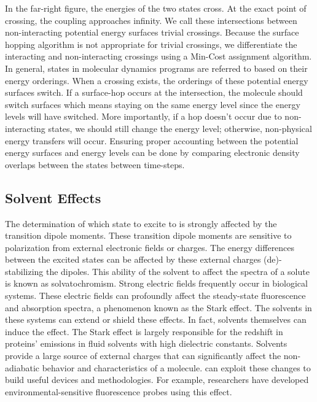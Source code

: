 In the far-right figure, the energies of the two states cross.
At the exact point of crossing, the coupling approaches infinity.
We call these intersections between non-interacting potential energy surfaces trivial crossings. Because the surface hopping algorithm is not appropriate for trivial crossings, we differentiate the interacting and non-interacting crossings using a Min-Cost assignment algorithm. \cite{fernandez2012identification} 
In general, states in molecular dynamics programs are referred to based on their energy orderings. When a crossing exists, the orderings of these potential energy surfaces switch. If a surface-hop occurs at the intersection, the molecule should switch surfaces which means staying on the same energy level since the energy levels will have switched. More importantly, if a hop doesn't occur due to non-interacting states, we should still change the energy level; otherwise, non-physical energy transfers will occur. Ensuring proper accounting between the potential energy surfaces and energy levels can be done by comparing electronic density overlaps between the states between time-steps.

\subsection{Solvent Effects}
The determination of which state to excite to is strongly affected by the transition dipole moments. These transition dipole moments are sensitive to polarization from external electronic fields or charges. The energy differences between the excited states can be affected by these external charges (de)-stabilizing the dipoles.
This ability of the solvent to affect the spectra of a solute is known as solvatochromism. \cite{marini2010solvatochromism}
 Strong electric fields frequently occur in biological systems.\cite{park1999vibrational,kriegl2003ligand} 
These electric fields can profoundly affect the steady-state fluorescence and absorption spectra, a phenomenon known as the Stark effect. \cite{Park2013} The solvents in these systems can extend or shield these effects. In fact, solvents themselves can induce the effect. The Stark effect is largely responsible for the redshift in proteins' emissions in fluid solvents with high dielectric constants.\cite{callis1997tryptophan,park1999vibrational} Solvents provide a large source of external charges that can significantly affect the non-adiabatic behavior and characteristics of a molecule.\cite{furukawa2015external}  can exploit these changes to build useful devices and methodologies.\cite{massey1998effect,bondar1999preferential}
For example, researchers have developed environmental-sensitive fluorescence probes using this effect. \cite{klymchenko2004bimodal}

